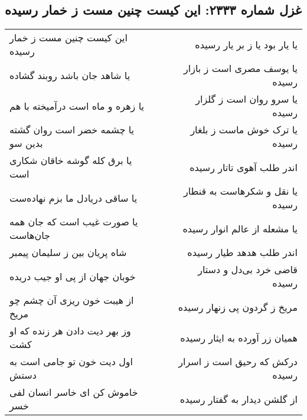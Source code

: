 \begin{center}
\section*{غزل شماره ۲۳۳۳: این کیست چنین مست ز خمار رسیده}
\label{sec:2333}
\begin{longtable}{l p{0.5cm} r}
این کیست چنین مست ز خمار رسیده
&&
یا یار بود یا ز بر یار رسیده
\\
یا شاهد جان باشد روبند گشاده
&&
یا یوسف مصری است ز بازار رسیده
\\
یا زهره و ماه است درآمیخته با هم
&&
یا سرو روان است ز گلزار رسیده
\\
یا چشمه خضر است روان گشته بدین سو
&&
یا ترک خوش ماست ز بلغار رسیده
\\
یا برق کله گوشه خاقان شکاری است
&&
اندر طلب آهوی تاتار رسیده
\\
یا ساقی دریادل ما بزم نهاده‌ست
&&
یا نقل و شکرهاست به قنطار رسیده
\\
یا صورت غیب است که جان همه جان‌هاست
&&
یا مشعله از عالم انوار رسیده
\\
شاه پریان بین ز سلیمان پیمبر
&&
اندر طلب هدهد طیار رسیده
\\
خوبان جهان از پی او جیب دریده
&&
قاضی خرد بی‌دل و دستار رسیده
\\
از هیبت خون ریزی آن چشم چو مریخ
&&
مریخ ز گردون پی زنهار رسیده
\\
وز بهر دیت دادن هر زنده که او کشت
&&
همیان زر آورده به ایثار رسیده
\\
اول دیت خون تو جامی است به دستش
&&
درکش که رحیق است ز اسرار رسیده
\\
خاموش کن ای خاسر انسان لفی خسر
&&
از گلشن دیدار به گفتار رسیده
\\
\end{longtable}
\end{center}
